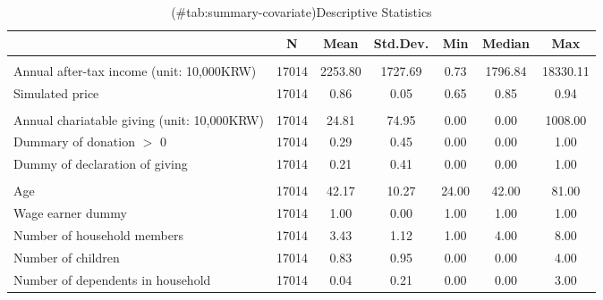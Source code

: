 \begin{table}

\caption{(\#tab:summary-covariate)Descriptive Statistics}
\centering
\fontsize{8}{10}\selectfont
\begin{threeparttable}
\begin{tabular}[t]{lcccccc}
\toprule
  & N & Mean & Std.Dev. & Min & Median & Max\\
\midrule
\addlinespace[0.3em]
\multicolumn{7}{l}{\textit{Income and giving price}}\\
\hspace{1em}Annual after-tax income (unit: 10,000KRW) & 17014 & \num{2253.80} & \num{1727.69} & \num{0.73} & \num{1796.84} & \num{18330.11}\\
\hspace{1em}Simulated price & 17014 & \num{0.86} & \num{0.05} & \num{0.65} & \num{0.85} & \num{0.94}\\
\addlinespace[0.3em]
\multicolumn{7}{l}{\textit{Charitable giving}}\\
\hspace{1em}Annual chariatable giving (unit: 10,000KRW) & 17014 & \num{24.81} & \num{74.95} & \num{0.00} & \num{0.00} & \num{1008.00}\\
\hspace{1em}Dummary of donation $>$ 0 & 17014 & \num{0.29} & \num{0.45} & \num{0.00} & \num{0.00} & \num{1.00}\\
\hspace{1em}Dummy of declaration of giving & 17014 & \num{0.21} & \num{0.41} & \num{0.00} & \num{0.00} & \num{1.00}\\
\addlinespace[0.3em]
\multicolumn{7}{l}{\textit{Demographics}}\\
\hspace{1em}Age & 17014 & \num{42.17} & \num{10.27} & \num{24.00} & \num{42.00} & \num{81.00}\\
\hspace{1em}Wage earner dummy & 17014 & \num{1.00} & \num{0.00} & \num{1.00} & \num{1.00} & \num{1.00}\\
\hspace{1em}Number of household members & 17014 & \num{3.43} & \num{1.12} & \num{1.00} & \num{4.00} & \num{8.00}\\
\hspace{1em}Number of children & 17014 & \num{0.83} & \num{0.95} & \num{0.00} & \num{0.00} & \num{4.00}\\
\hspace{1em}Number of dependents in household & 17014 & \num{0.04} & \num{0.21} & \num{0.00} & \num{0.00} & \num{3.00}\\

\end{tabular}
\end{threeparttable}
\end{table}
